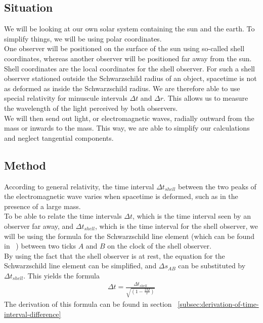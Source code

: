 \documentclass[reprint,english,notitlepage]{revtex4-2}
\begin{document}
    \subsection{Situation}\label{subsec:situation1}
        We will be looking at our own solar system containing the sun and the earth.
        To simplify things, we will be using polar coordinates.\\
        One observer will be positioned on the surface of the sun using so-called shell coordinates, whereas another observer will be positioned far away from the sun.
        Shell coordinates are the local coordinates for the shell observer.
        For such a shell observer stationed outside the Schwarzschild radius of an object, spacetime is not as deformed as inside the Schwarzschild radius.
        We are therefore able to use special relativity for minuscule intervals $\Delta t$ and $\Delta r$.
        This allows us to measure the wavelength of the light perceived by both observers.\\
        We will then send out light, or electromagnetic waves, radially outward from the mass or inwards to the mass.
        This way, we are able to simplify our calculations and neglect tangential components.

    \subsection{Method}\label{subsec:method1}
        According to general relativity, the time interval $\Delta t_{shell}$ between the two peaks of the electromagnetic wave varies when spacetime is deformed, such as in the presence of a large mass.\\
        To be able to relate the time intervals $\Delta t$, which is the time interval seen by an observer far away, and $\Delta t_{shell}$, which is the time interval for the shell observer, we will be using the formula for the Schwarzschild line element (which can be found in ~\parencite[][]{lecture2c}) between two ticks $A$ and $B$ on the clock of the shell observer.\\

        By using the fact that the shell observer is at rest, the equation for the Schwarzschild line element can be simplified, and $\Delta s_{AB}$ can be substituted by $\Delta t_{shell}$.
        This yields the formula
        \begin{align}
                \Delta t = \frac{\Delta t_{shell}}{\sqrt{\left(1-\frac{2M}{r}\right)}} \label{eq2}
        \end{align}
        The derivation of this formula can be found in section ~\ref{subsec:derivation-of-time-interval-difference}\\\\
\end{document}
